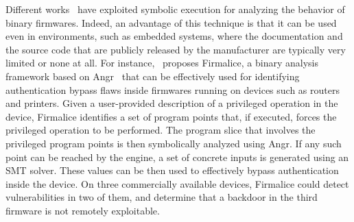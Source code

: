 Different works~\cite{DMR-USEC13,ZBF-NDSS14,FIRMALICE-NDSS15} have exploited symbolic execution for analyzing the behavior of binary firmwares. Indeed, an advantage of this technique is that it can be used even in environments, such as embedded systems, where the documentation and the source code that are publicly released by the manufacturer are typically very limited or none at all. For instance,~\cite{FIRMALICE-NDSS15} proposes Firmalice, a binary analysis framework based on {\sc Angr}~\cite{ANGR-SSP16} that can be effectively used for identifying authentication bypass flaws inside firmwares running on devices such as routers and printers. Given a user-provided description of a privileged operation in the device, Firmalice identifies a set of program points that, if executed, forces the privileged operation to be performed. The program slice that involves the privileged program points is then symbolically analyzed using {\sc Angr}. If any such point can be reached by the engine, a set of concrete inputs is generated using an SMT solver. These values can be then used to effectively bypass authentication inside the device. On three commercially available devices, Firmalice could detect vulnerabilities in two of them, and determine that a backdoor in the third firmware is not remotely exploitable.